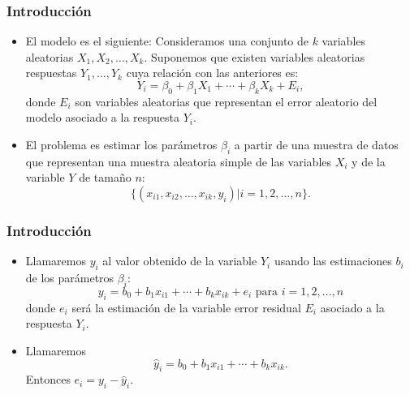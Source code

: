 \begin{frame}
\frametitle{Introducción}
\begin{itemize}
\item<2->{El modelo es el siguiente: Consideramos una conjunto de $k$ variables aleatorias $X_{1 },X_{2},\ldots,X_{k}$.
Suponemos que existen variables aleatorias respuestas $Y_1,\ldots,Y_k$ cuya relación con las anteriores es:
$$Y_i=\beta_0+\beta_1 X_{1}+\cdots+\beta_{k} X_k+E_i,$$
donde $E_i$ son variables aleatorias que representan el error aleatorio del modelo asociado a la respuesta $Y_i$.}
\item<3->{El problema es estimar los parámetros $\beta_i$ a
partir de una muestra de datos que representan una muestra aleatoria simple de las variables $X_i$ y de la variable $Y$ de tamaño $n$:
$$\{(x_{i1},x_{i2},\ldots,x_{ik},y_i)| i=1,2,\ldots,n\}.$$
}
\end{itemize}
\end{frame}


\begin{frame}
\frametitle{Introducción}

\begin{itemize}
\item<2->{Llamaremos $y_i$ al valor obtenido de la variable $Y_i$ usando las estimaciones $b_i$ de los parámetros $\beta_i$:
$$y_i=b_0+b_1 x_{i1}+\cdots+b_{k} x_{ik}+e_i\mbox{ para } i=1,2,\ldots,n$$
donde $e_i$ será la estimación de la variable error residual $E_i$ asociado  a la respuesta $Y_i$.}
\item<3->{Llamaremos
$$\hat{y}_i=b_0+b_1 x_{i 1}+\cdots+b_{k} x_{i k}.$$ 
Entonces
$e_i=y_i-\hat{y}_i.$}
\end{itemize}
\end{frame}

